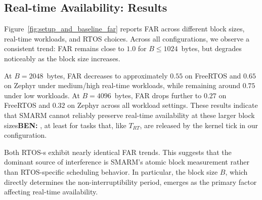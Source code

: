 \documentclass{ieeeaccess}
\DeclareRobustCommand{\ben}[1]{{\color{BENcolor}\textbf{BEN:} #1}}
\begin{document}
\subsection{Real-time Availability: Results}

Figure~\ref{fig:setup_and_baseline_far} reports FAR across different block sizes, real-time workloads, and RTOS choices.
Across all configurations, we observe a consistent trend: FAR remains close to $1.0$ for $B \leq 1024$~bytes, but degrades noticeably as the block size increases.

At $B = 2048$~bytes, FAR decreases to approximately $0.55$ on FreeRTOS and $0.65$ on Zephyr under medium/high real-time workloads, while remaining around $0.75$ under low workloads.
At $B = 4096$~bytes, FAR drops further to $0.27$ on FreeRTOS and $0.32$ on Zephyr across all workload settings.
These results indicate that SMARM cannot reliably preserve real-time availability at these larger block sizes\ben{, at least for tasks that, like $T_{RT}$, are released by the kernel tick in our configuration}.


Both RTOS-s exhibit nearly identical FAR trends.
This suggests that the dominant source of interference is SMARM’s atomic block measurement rather than RTOS-specific scheduling behavior.
In particular, the block size $B$, which directly determines the non-interruptibility period, emerges as the primary factor affecting real-time availability.
\end{document}

